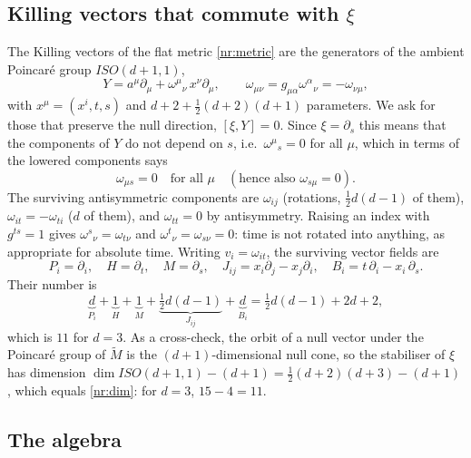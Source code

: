 \subsection{Killing vectors that commute with $\xi$}

The Killing vectors of the flat metric \eqref{nr:metric} are the generators
of the ambient Poincar\'e group $ISO(d+1,1)$,
\begin{equation}
  Y=a^\mu\partial_\mu+\omega^\mu{}_\nu\,x^\nu\partial_\mu,\qquad
  \omega_{\mu\nu}=g_{\mu\alpha}\omega^\alpha{}_\nu=-\omega_{\nu\mu},
  \label{nr:killing}
\end{equation}
with $x^\mu=(x^i,t,s)$ and $d+2+\tfrac12(d+2)(d+1)$ parameters. We ask for those
that preserve the null direction, $[\xi,Y]=0$. Since $\xi=\partial_s$ this means
that the components of $Y$ do not depend on $s$, i.e.\ $\omega^\mu{}_s=0$ for all
$\mu$, which in terms of the lowered components says
\begin{equation}
  \omega_{\mu s}=0\quad\text{for all }\mu
  \quad(\text{hence also }\omega_{s\mu}=0).
  \label{nr:omegacond}
\end{equation}
The surviving antisymmetric components are $\omega_{ij}$ (rotations, $\tfrac12 d(d-1)$
of them), $\omega_{it}=-\omega_{ti}$ ($d$ of them), and $\omega_{tt}=0$ by
antisymmetry. Raising an index with $g^{ts}=1$ gives $\omega^s{}_\nu=\omega_{t\nu}$
and $\omega^t{}_\nu=\omega_{s\nu}=0$: time is not rotated into anything, as
appropriate for absolute time. Writing $v_i=\omega_{it}$, the surviving vector
fields are
\begin{equation}
  P_i=\partial_i,\quad H=\partial_t,\quad M=\partial_s,\quad
  J_{ij}=x_i\partial_j-x_j\partial_i,\quad
  B_i=t\,\partial_i-x_i\,\partial_s .
  \label{nr:vf}
\end{equation}
Their number is
\begin{equation}
  \underbrace{d}_{P_i}+\underbrace{1}_{H}+\underbrace{1}_{M}
  +\underbrace{\tfrac12 d(d-1)}_{J_{ij}}+\underbrace{d}_{B_i}
  =\tfrac12 d(d-1)+2d+2 ,
  \label{nr:dim}
\end{equation}
which is $11$ for $d=3$. As a cross-check, the orbit of a null vector under the
Poincar\'e group of $\tilde M$ is the $(d+1)$-dimensional null cone, so the
stabiliser of $\xi$ has dimension
$\dim ISO(d+1,1)-(d+1)=\tfrac12(d+2)(d+3)-(d+1)$, which equals \eqref{nr:dim}:
for $d=3$, $15-4=11$.

\subsection{The algebra}

